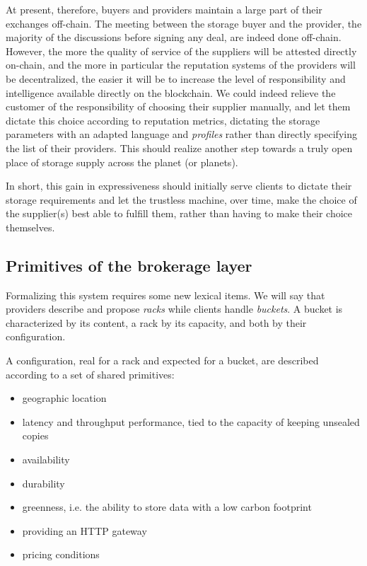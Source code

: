 \documentclass[twoside,twocolumn]{article}
\begin{document}
At present, therefore, buyers and providers maintain a large part of their exchanges off-chain.
The meeting between the storage buyer and the provider, the majority of the discussions before signing any deal, are indeed done off-chain.
However, the more the quality of service of the suppliers will be attested directly on-chain,
and the more in particular the reputation systems of the providers will be decentralized,
the easier it will be to increase the level of responsibility and intelligence available directly on the blockchain.
We could indeed relieve the customer of the responsibility of choosing their supplier manually,
and let them dictate this choice according to reputation metrics,
dictating the storage parameters with an adapted language and \emph{profiles} rather than directly specifying the list of their providers.
This should realize another step towards a truly open place of storage supply across the planet (or planets).

In short, this gain in expressiveness should initially serve clients to dictate their storage requirements
and let the trustless machine, over time, make the choice of the supplier(s) best able to fulfill them, rather than having to make their choice themselves.

\subsection{Primitives of the brokerage layer}

Formalizing this system requires some new lexical items.
We will say that providers describe and propose \emph{racks} while clients handle \emph{buckets}.
A bucket is characterized by its content, a rack by its capacity, and both by their configuration.

A configuration, real for a rack and expected for a bucket, are described according to a set of shared primitives:
\begin{itemize}
  \item geographic location
  \item latency and throughput performance, tied to the capacity of keeping unsealed copies
  \item availability
  \item durability
  \item greenness, i.e. the ability to store data with a low carbon footprint
  \item providing an HTTP gateway
  \item pricing conditions
\end{itemize}
\end{document}
